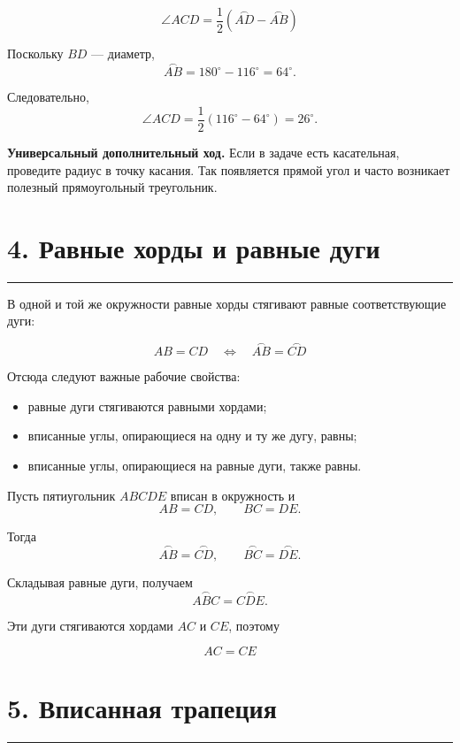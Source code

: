 \documentclass[a4paper,12pt]{article}
\newcommand{\sectionrule}{
  \par
  \vspace{0.2em}
  \noindent
  \textcolor{accent}{\rule{\linewidth}{0.7pt}}
  \vspace{0.35em}
}
\newcommand{\key}[1]{\textbf{\textcolor{darkaccent}{#1}}}
\newcommand{\formula}[1]{\[\boxed{#1}\]}
\begin{document}
\formula{
\angle ACD
=
\frac12
\left(
\overset{\frown}{AD}
-
\overset{\frown}{AB}
\right)
}

Поскольку \(BD\) --- диаметр,
\[
\overset{\frown}{AB}
=
180^\circ-116^\circ
=
64^\circ.
\]

Следовательно,
\[
\angle ACD
=
\frac12(116^\circ-64^\circ)
=
26^\circ.
\]

\key{Универсальный дополнительный ход.}
Если в задаче есть касательная,
проведите радиус в точку касания.
Так появляется прямой угол и часто возникает
полезный прямоугольный треугольник.

\section*{4. Равные хорды и равные дуги}
\sectionrule

В одной и той же окружности равные хорды стягивают
равные соответствующие дуги:

\formula{
AB=CD
\quad\Longleftrightarrow\quad
\overset{\frown}{AB}
=
\overset{\frown}{CD}
}

Отсюда следуют важные рабочие свойства:

\begin{itemize}

  \item равные дуги стягиваются равными хордами;

  \item вписанные углы, опирающиеся на одну и ту же дугу,
  равны;

  \item вписанные углы, опирающиеся на равные дуги,
  также равны.

\end{itemize}

Пусть пятиугольник \(ABCDE\) вписан в окружность и
\[
AB=CD,
\qquad
BC=DE.
\]

Тогда
\[
\overset{\frown}{AB}
=
\overset{\frown}{CD},
\qquad
\overset{\frown}{BC}
=
\overset{\frown}{DE}.
\]

Складывая равные дуги, получаем
\[
\overset{\frown}{ABC}
=
\overset{\frown}{CDE}.
\]

Эти дуги стягиваются хордами \(AC\) и \(CE\),
поэтому

\formula{AC=CE}

\section*{5. Вписанная трапеция}
\sectionrule
\end{document}

